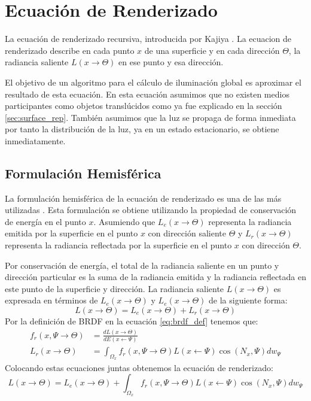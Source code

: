 \section{Ecuación de Renderizado}
La ecuación de renderizado recursiva, introducida por Kajiya \cite{kajiya86}. La ecuacion de renderizado describe en cada punto $x$ de una superficie y en cada dirección $\Theta$, la radiancia saliente $L(x\to\Theta)$ en ese punto y esa dirección.

El objetivo de un algoritmo para el cálculo de iluminación global es aproximar el resultado de esta ecuación. En esta ecuación asumimos que no existen medios participantes como objetos translúcidos como ya fue explicado en la sección \ref{sec:surface_rep}. También asumimos que la luz se propaga de forma inmediata por tanto la distribución de la luz, ya en un estado estacionario, se obtiene inmediatamente. 

\subsection{Formulación Hemisférica}
La formulación hemisférica de la ecuación de renderizado es una de las más utilizadas \cite{advanced_gi2006}. Esta formulación se obtiene utilizando la propiedad de conservación de energía en el punto $x$. Asumiendo que $L_{e}(x\to\Theta)$ representa la radiancia emitida por la superficie en el punto $x$ con dirección saliente $\Theta$ y $L_{r}(x\to\Theta)$ representa la radiancia reflectada por la superficie en el punto $x$ con dirección $\Theta$.

Por conservación de energía, el total de la radiancia saliente en un punto y dirección particular es la suma de la radiancia emitida y la radiancia reflectada en este punto de la superficie y dirección. La radiancia saliente $L(x\to\Theta)$ es expresada en términos de $L_{e}(x\to\Theta)$ y $L_{e}(x\to\Theta)$ de la siguiente forma:
\begin{equation}
    L(x\to\Theta) = L_{e}(x\to\Theta) + L_{r}(x\to\Theta)
    \label{eq:reflectance}
\end{equation}
Por la definición de \ac{BRDF} en la ecuación \ref{eq:brdf_def} tenemos que:
\begin{equation}
	\begin{split}
        f_{r}(x, \Psi\to\Theta) &= \frac{dL(x\to\Theta)}{dE(x\gets\Psi)}\\
        L_{r}(x\to\Theta) &= \int_{\Omega_{x}}{f_{r}(x, \Psi\to\Theta)L(x\gets\Psi)\cos(N_{x}, \Psi)dw_{\Psi}}
	\end{split}
	\label{eq:rendering_eq_LR}
\end{equation}
Colocando estas ecuaciones juntas obtenemos la ecuación de renderizado:
\begin{equation}
    L(x\to\Theta) = L_{e}(x\to\Theta) + \int_{\Omega_{x}}{f_{r}(x, \Psi\to\Theta)L(x\gets\Psi)\cos(N_{x}, \Psi)dw_{\Psi}}
    \label{eq:rendering_eq}
\end{equation}

